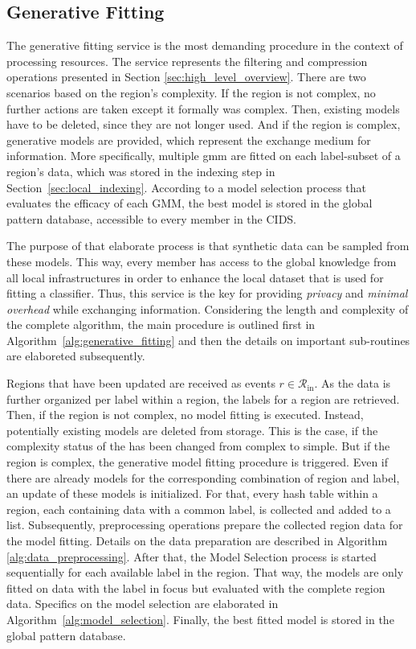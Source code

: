 \documentclass[../../main.tex]{subfiles}
\begin{document}
\subsection{Generative Fitting} \label{sec:generative_fitting}

The generative fitting service is the most demanding procedure in the context of processing resources. The service represents the filtering and compression operations presented in Section \ref{sec:high_level_overview}. There are two scenarios based on the region's complexity. If the region is not complex, no further actions are taken except it formally was complex. Then, existing models have to be deleted, since they are not longer used. And if the region is complex, generative models are provided, which represent the exchange medium for information. More specifically, multiple \gls{gmm} are fitted on each label-subset of a region's data, which was stored in the indexing step in Section~\ref{sec:local_indexing}. According to a model selection process that evaluates the efficacy of each GMM, the best model is stored in the global pattern database, accessible to every member in the CIDS. 

The purpose of that elaborate process is that synthetic data can be sampled from these models. This way, every member has access to the global knowledge from all local infrastructures in order to enhance the local dataset that is used for fitting a classifier. Thus, this service is the key for providing \textit{privacy} and \textit{minimal overhead} while exchanging information. Considering the length and complexity of the complete algorithm, the main procedure is outlined first in Algorithm~\ref{alg:generative_fitting} and then the details on important sub-routines are elaboreted subsequently. 

Regions that have been updated are received as events $r \in \mathcal{R}_\text{in}$. As the data is further organized per label within a region, the labels for a region are retrieved. Then, if the region is not complex, no model fitting is executed. Instead, potentially existing models are deleted from storage. This is the case, if the complexity status of the has been changed from complex to simple. But if the region is complex, the generative model fitting procedure is triggered. Even if there are already models for the corresponding combination of region and label, an update of these models is initialized. For that, every hash table within a region, each containing data with a common label, is collected and added to a list. Subsequently, preprocessing operations prepare the collected region data for the model fitting. Details on the data preparation are described in Algorithm \ref{alg:data_preprocessing}. After that, the Model Selection process is started sequentially for each available label in the region. That way, the models are only fitted on data with the label in focus but evaluated with the complete region data. Specifics on the model selection are elaborated in Algorithm~\ref{alg:model_selection}. Finally, the best fitted model is stored in the global pattern database. 
\end{document}
